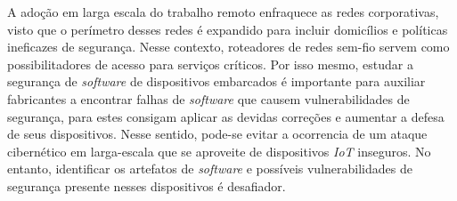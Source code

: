 


A adoção em larga escala do trabalho remoto enfraquece as redes corporativas, visto que o perímetro desses redes é expandido para incluir domicílios e políticas ineficazes de segurança. Nesse contexto, roteadores de redes sem-fio servem como possibilitadores de acesso para serviços críticos. Por isso mesmo, estudar a segurança de \textit{software} de dispositivos embarcados é importante para auxiliar fabricantes a encontrar falhas de \textit{software} que causem vulnerabilidades de segurança, para estes consigam aplicar as devidas correções e aumentar a defesa de seus dispositivos.
Nesse sentido, pode-se evitar a ocorrencia de um ataque cibernético em larga-escala que se aproveite de dispositivos \textit{IoT} inseguros. No entanto, identificar os artefatos de \textit{software} e possíveis vulnerabilidades de segurança presente nesses dispositivos é desafiador.

